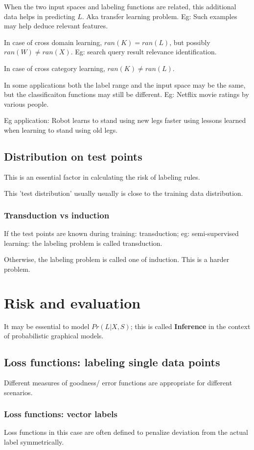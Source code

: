 \documentclass[oneside, article]{memoir}
\begin{document}
When the two input spaces and labeling functions are related, this additional data helps in predicting $L$. Aka transfer learning problem. Eg: Such examples may help deduce relevant features.

In case of cross domain learning, $ran(K) = ran(L)$, but possibly $ran(W) \neq ran(X)$. Eg: search query result relevance identification.

In case of cross category learning, $ran(K) \neq ran(L)$.

In some applications both the label range and the input space may be the same, but the classificaiton functions may still be different. Eg: Netflix movie ratings by various people.

Eg application: Robot learns to stand using new legs faster using lessons learned when learning to stand using old legs.

\section{Distribution on test points}
This is an essential factor in calculating the risk of labeling rules.

This 'test distribution' usually usually is close to the training data distribution.

\subsection{Transduction vs induction}
If the test points are known during training: transduction; eg: semi-supervised learning: the labeling problem is called transduction.

Otherwise, the labeling problem is called one of induction. This is a harder problem.

\chapter{Risk and evaluation}
It may be essential to model $Pr(L|X, S)$; this is called \textbf{Inference} in the context of probabilistic graphical models.

\section{Loss functions: labeling single data points}
Different measures of goodness/ error functions are appropriate for different scenarios.

\subsection{Loss functions: vector labels}
Loss functions in this case are often defined to penalize deviation from the actual label symmetrically.
\end{document}
